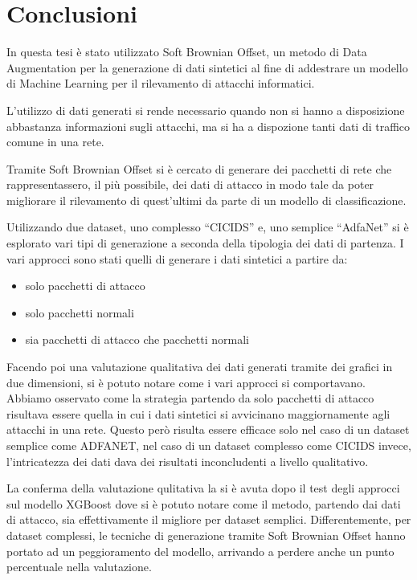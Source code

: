 \chapter{Conclusioni}

In questa tesi è stato utilizzato Soft Brownian Offset, un metodo di Data Augmentation per la generazione di dati sintetici al fine di addestrare un modello di Machine Learning per il rilevamento di attacchi informatici. 

L'utilizzo di dati generati si rende necessario quando non si hanno a disposizione abbastanza informazioni sugli attacchi, ma si ha a dispozione tanti dati di traffico comune in una rete. 

Tramite Soft Brownian Offset si è cercato di generare dei pacchetti di rete che rappresentassero, il più possibile, dei dati di attacco in modo tale da poter migliorare il rilevamento di quest'ultimi da parte di un modello di classificazione.

Utilizzando due dataset, uno complesso ``CICIDS'' e, uno semplice ``AdfaNet'' si è esplorato vari tipi di generazione a seconda della tipologia dei dati di partenza. I vari approcci sono stati quelli di generare i dati sintetici a partire da:

\begin{itemize}
  \item solo pacchetti di attacco
  \item solo pacchetti normali
  \item sia pacchetti di attacco che pacchetti normali
\end{itemize}

Facendo poi una valutazione qualitativa dei dati generati tramite dei grafici in due dimensioni, si è potuto notare come i vari approcci si comportavano. Abbiamo osservato come la strategia partendo da solo pacchetti di attacco risultava essere quella in cui i dati sintetici si avvicinano maggiornamente agli attacchi in una rete. Questo però risulta essere efficace solo nel caso di un dataset semplice come ADFANET, nel caso di un dataset complesso come CICIDS invece, l'intricatezza dei dati dava dei risultati inconcludenti a livello qualitativo.

La conferma della valutazione qulitativa la si è avuta dopo il test degli approcci sul modello XGBoost dove si è potuto notare come il metodo, partendo dai dati di attacco, sia effettivamente il migliore per dataset semplici.
Differentemente, per dataset complessi, le tecniche di generazione tramite Soft Brownian Offset hanno portato ad un peggioramento del modello, arrivando a perdere anche un punto percentuale nella valutazione.

